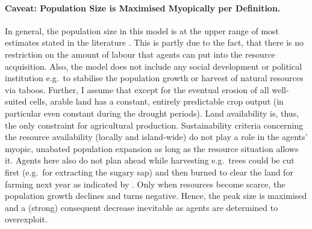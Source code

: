 \paragraph{Caveat: Population Size is Maximised Myopically per Definition.}
In general, the population size in this model is at the upper range of most estimates stated in the literature \citep{Bahn2017}.
This is partly due to the fact, that there is no restriction on the amount of labour that agents can put into the resource acquisition. 
Also, the model does not include any social development or political institution e.g.\ to stabilise the population growth or harvest of natural resources via taboos.
Further, I assume that except for the eventual erosion of all well-suited cells, arable land has a constant, entirely predictable crop output (in particular even constant during the drought periods). 
Land availability is, thus, the only constraint for agricultural production. 
Sustainability criteria concerning the resource availability (locally and island-wide) do not play a role in the agents' myopic, unabated population expansion as long as the resource situation allows it.
Agents here also do not plan ahead while harvesting e.g.\ trees could be cut first (e.g.\ for extracting the sugary sap) and then burned to clear the land for farming next year as indicated by \citet{Mieth2015}.
Only when resources become scarce, the population growth declines and turns negative.
Hence, the peak size is maximised and a (strong) consequent decrease inevitable as agents are determined to overexploit.


